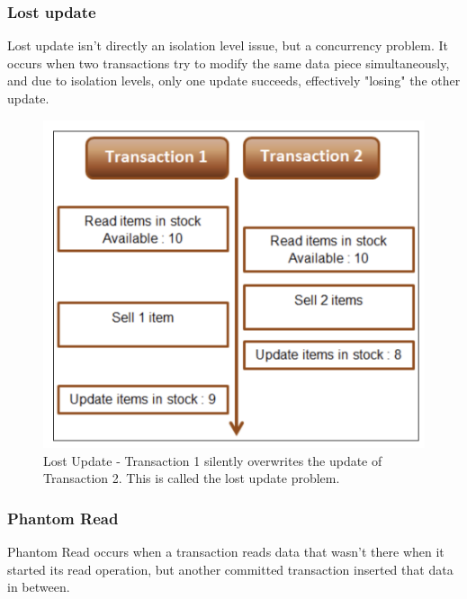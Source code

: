 \subsubsection{Lost update}

Lost update isn't directly an isolation level issue, but a concurrency problem. It occurs when two transactions try to modify the same data piece simultaneously, and due to isolation levels, only one update succeeds, effectively "losing" the other update.


\begin{figure}[H]
  \includegraphics[width=\linewidth]{images/chapter-jdbc/lost_update.png}
  \caption{Lost Update - Transaction 1 silently overwrites the update of Transaction 2. This is called the lost update problem.}
  \label{fig:paths}
\end{figure}

\subsubsection{Phantom Read}

Phantom Read occurs when a transaction reads data that wasn't there when it started its read operation, but another committed transaction inserted that data in between. 

